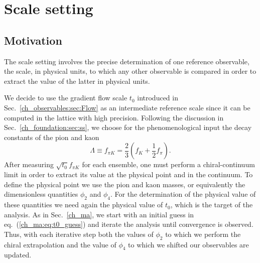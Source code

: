 \chapter{Scale setting}


\label{ch_ss}


\section{Motivation}
\label{ch_ss:sec:introduction}

The scale setting involves the precise determination of one reference observable, the scale, in physical units, to which any other observable is compared in order to extract the value of the latter in physical units. 

We decide to use the gradient flow scale $t_0$ introduced in Sec.~\ref{ch_observables:sec:Flow} as an intermediate reference scale since it can be computed in the lattice with high precision. Following the discussion in Sec.~\ref{ch_foundation:sec:ss}, we choose for the phenomenological input the decay constants of the pion and kaon
\begin{equation}
\label{ch_ss:eq:fpik}
\Lambda\equiv f_{\pi K}=\frac{2}{3}\left(f_K+\frac{1}{2}f_{\pi}\right).
\end{equation}
After measuring $\sqrt{t_0}f_{\pi K}$ for each ensemble, one must perform a chiral-continuum limit in order to extract its value at the physical point and in the continuum. To define the physical point we use the pion and kaon masses, or equivalently the dimensionless quantities $\phi_2$ and $\phi_4$. For the determination of the physical value of these quantities we need again the physical value of $t_0$, which is the target of the analysis. As in Sec.~\ref{ch_ma}, we start with an initial guess in eq.~(\ref{ch_ma:eq:t0_guess}) and iterate the analysis until convergence is observed. Thus, with each iterative step both the values of $\phi_2$ to which we perform the chiral extrapolation and the value of $\phi_4$ to which we shifted our observables are updated. 

